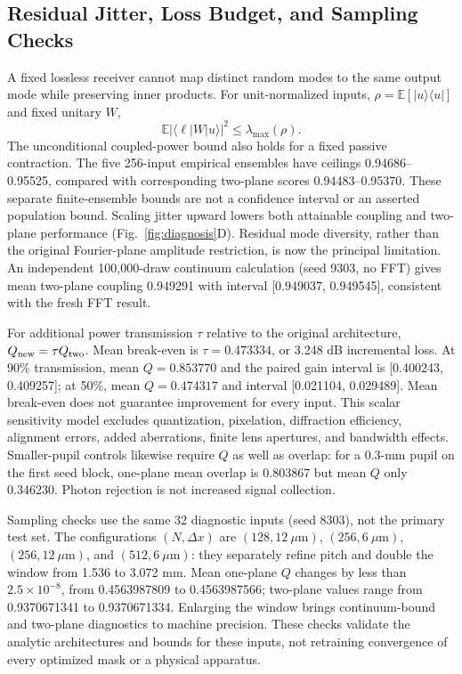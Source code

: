 \documentclass[journal]{IEEEtran}
\begin{document}
\subsection{Residual Jitter, Loss Budget, and Sampling Checks}
A fixed lossless receiver cannot map distinct random modes to the same output mode while preserving inner products. For unit-normalized inputs, $\rho=\mathbb{E}[|u\rangle\langle u|]$ and fixed unitary $W$,
\begin{equation}
\mathbb{E}|\langle\ell|W|u\rangle|^2\leq\lambda_{\max}(\rho).
\label{eq:ensemblebound}
\end{equation}
The unconditional coupled-power bound also holds for a fixed passive contraction. The five 256-input empirical ensembles have ceilings 0.94686--0.95525, compared with corresponding two-plane scores 0.94483--0.95370. These separate finite-ensemble bounds are not a confidence interval or an asserted population bound. Scaling jitter upward lowers both attainable coupling and two-plane performance (Fig.~\ref{fig:diagnosis}D). Residual mode diversity, rather than the original Fourier-plane amplitude restriction, is now the principal limitation. An independent 100,000-draw continuum calculation (seed 9303, no FFT) gives mean two-plane coupling 0.949291 with interval [0.949037, 0.949545], consistent with the fresh FFT result.

For additional power transmission $\tau$ relative to the original architecture, $Q_{\rm new}=\tau Q_{\rm two}$. Mean break-even is $\tau=0.473334$, or 3.248 dB incremental loss. At 90\% transmission, mean $Q=0.853770$ and the paired gain interval is [0.400243, 0.409257]; at 50\%, mean $Q=0.474317$ and interval [0.021104, 0.029489]. Mean break-even does not guarantee improvement for every input. This scalar sensitivity model excludes quantization, pixelation, diffraction efficiency, alignment errors, added aberrations, finite lens apertures, and bandwidth effects. Smaller-pupil controls likewise require $Q$ as well as overlap: for a 0.3-mm pupil on the first seed block, one-plane mean overlap is 0.803867 but mean $Q$ only 0.346230. Photon rejection is not increased signal collection.

Sampling checks use the same 32 diagnostic inputs (seed 8303), not the primary test set. The configurations $(N,\Delta x)$ are $(128,12~\mu\mathrm{m})$, $(256,6~\mu\mathrm{m})$, $(256,12~\mu\mathrm{m})$, and $(512,6~\mu\mathrm{m})$: they separately refine pitch and double the window from 1.536 to 3.072 mm. Mean one-plane $Q$ changes by less than $2.5\times10^{-8}$, from 0.4563987809 to 0.4563987566; two-plane values range from 0.9370671341 to 0.9370671334. Enlarging the window brings continuum-bound and two-plane diagnostics to machine precision. These checks validate the analytic architectures and bounds for these inputs, not retraining convergence of every optimized mask or a physical apparatus.
\end{document}
